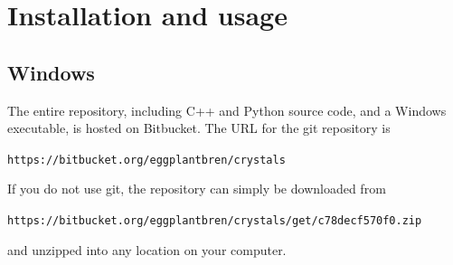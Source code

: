 \documentclass[a4paper, 12pt]{article}
\begin{document}
\section{Installation and usage}

\subsection*{Windows}
The entire repository, including C++ and Python source code, and a Windows
executable, is hosted on Bitbucket. The URL for the git repository is

{\tt https://bitbucket.org/eggplantbren/crystals}

If you do not use git, the repository can simply be downloaded from

{\tt https://bitbucket.org/eggplantbren/crystals/get/c78decf570f0.zip}

and unzipped into any location on your computer.




\end{document}
